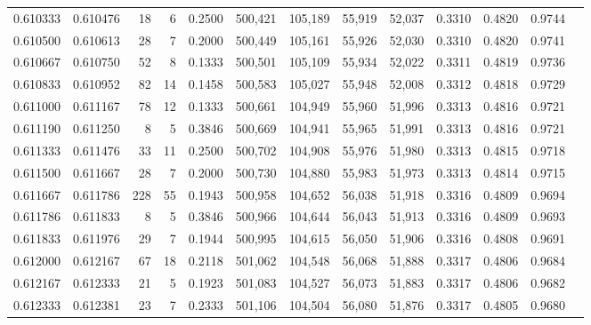 \begin{tabular}{rrrrrrrrrrrrr}
0.610333 & 0.610476 &    18 &   6 &                                     0.2500 & 500,421 & 105,189 &  55,919 &  52,037 & 0.3310 & 0.4820 & 0.9744 \\
0.610500 & 0.610613 &    28 &   7 &                                     0.2000 & 500,449 & 105,161 &  55,926 &  52,030 & 0.3310 & 0.4820 & 0.9741 \\
0.610667 & 0.610750 &    52 &   8 &                                     0.1333 & 500,501 & 105,109 &  55,934 &  52,022 & 0.3311 & 0.4819 & 0.9736 \\
0.610833 & 0.610952 &    82 &  14 &                                     0.1458 & 500,583 & 105,027 &  55,948 &  52,008 & 0.3312 & 0.4818 & 0.9729 \\
0.611000 & 0.611167 &    78 &  12 &                                     0.1333 & 500,661 & 104,949 &  55,960 &  51,996 & 0.3313 & 0.4816 & 0.9721 \\
0.611190 & 0.611250 &     8 &   5 &                                     0.3846 & 500,669 & 104,941 &  55,965 &  51,991 & 0.3313 & 0.4816 & 0.9721 \\
0.611333 & 0.611476 &    33 &  11 &                                     0.2500 & 500,702 & 104,908 &  55,976 &  51,980 & 0.3313 & 0.4815 & 0.9718 \\
0.611500 & 0.611667 &    28 &   7 &                                     0.2000 & 500,730 & 104,880 &  55,983 &  51,973 & 0.3313 & 0.4814 & 0.9715 \\
0.611667 & 0.611786 &   228 &  55 &                                     0.1943 & 500,958 & 104,652 &  56,038 &  51,918 & 0.3316 & 0.4809 & 0.9694 \\
0.611786 & 0.611833 &     8 &   5 &                                     0.3846 & 500,966 & 104,644 &  56,043 &  51,913 & 0.3316 & 0.4809 & 0.9693 \\
0.611833 & 0.611976 &    29 &   7 &                                     0.1944 & 500,995 & 104,615 &  56,050 &  51,906 & 0.3316 & 0.4808 & 0.9691 \\
0.612000 & 0.612167 &    67 &  18 &                                     0.2118 & 501,062 & 104,548 &  56,068 &  51,888 & 0.3317 & 0.4806 & 0.9684 \\
0.612167 & 0.612333 &    21 &   5 &                                     0.1923 & 501,083 & 104,527 &  56,073 &  51,883 & 0.3317 & 0.4806 & 0.9682 \\
0.612333 & 0.612381 &    23 &   7 &                                     0.2333 & 501,106 & 104,504 &  56,080 &  51,876 & 0.3317 & 0.4805 & 0.9680 \\

\end{tabular}
